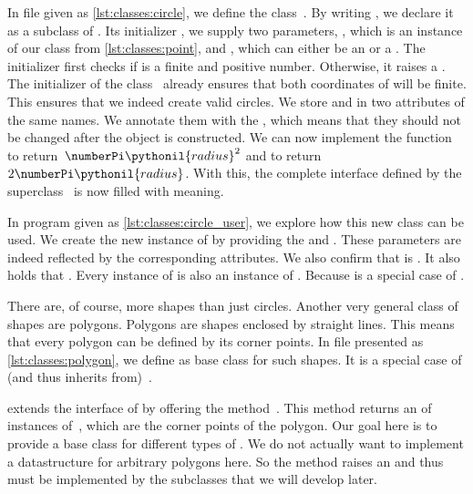In file  given as \cref{lst:classes:circle}, we define the class~.
By writing , we declare it as a subclass of .
Its initializer , we supply two parameters, , which is an instance of our class  from \cref{lst:classes:point}, and , which can either be an  or a .
The initializer first checks if  is a finite and positive number.
Otherwise, it raises a .
The initializer of the class~ already ensures that both coordinates of  will be finite.
This ensures that we indeed create valid circles.
We store  and  in two attributes of the same names.
We annotate them with the  , which means that they should not be changed after the object is constructed.
We can now implement the function  to return~$\numberPi\pythonil{radius}^2$ and  to return~$2\numberPi\pythonil{radius}$.
With this, the complete interface defined by the superclass~ is now filled with meaning.

In program  given as \cref{lst:classes:circle_user}, we explore how this new class can be used.
We create the new instance  of  by providing the  and .
These parameters are indeed reflected by the corresponding attributes.
We also confirm that  is .
It also holds that .
Every instance of  is also an instance of .
Because  is a special case of .

There are, of course, more shapes than just circles.
Another very general class of shapes are polygons.
Polygons are shapes enclosed by straight lines.
This means that every polygon can be defined by its corner points.
In file  presented as \cref{lst:classes:polygon}, we define  as base class for such shapes.
It is a special case of (and thus inherits from)~.

 extends the interface of  by offering the method~.
This method returns an  of instances of~, which are the corner points of the polygon.
Our goal here is to provide a base class for different types of .
We do not actually want to implement a datastructure for arbitrary polygons here.
So the method  raises an  and thus must be implemented by the subclasses that we will develop later.

